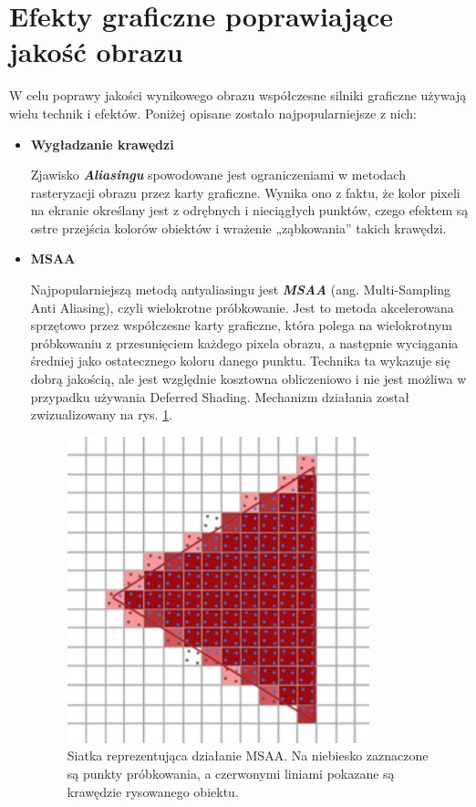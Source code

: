\section{Efekty graficzne poprawiające jakość obrazu}

W celu poprawy jakości wynikowego obrazu współczesne silniki graficzne używają wielu technik i efektów. Poniżej opisane zostało najpopularniejsze z nich:

\begin{itemize}
	\item \textbf{Wygładzanie krawędzi}

	Zjawisko \emph{\textbf{Aliasingu}} spowodowane jest ograniczeniami w metodach rasteryzacji obrazu przez karty graficzne. Wynika ono z faktu, że kolor pixeli na ekranie określany jest z odrębnych i nieciągłych punktów, czego efektem są ostre przejścia kolorów obiektów i wrażenie „ząbkowania'' takich krawędzi.
	
	\item \textbf{MSAA}
	
	Najpopularniejszą metodą antyaliasingu jest \emph{\textbf{MSAA}} (ang. Multi-Sampling Anti Aliasing), czyli wielokrotne próbkowanie. Jest to metoda akcelerowana sprzętowo przez współczesne karty graficzne, która polega na wielokrotnym próbkowaniu z przesunięciem każdego pixela obrazu, a następnie wyciągania średniej jako ostatecznego koloru danego punktu. Technika ta wykazuje się dobrą jakością, ale jest względnie kosztowna obliczeniowo i nie jest możliwa w przypadku używania Deferred Shading. Mechanizm działania został zwizualizowany na rys. \ref{intro-msaa}.
	
	\begin{figure}[htbp]
		\centering
		\includegraphics[width=3.4483in,height=3.5in]{images/9_MSAA_grid.png}
		\caption{Siatka reprezentująca działanie MSAA. Na niebiesko zaznaczone są punkty próbkowania, a czerwonymi liniami pokazane są krawędzie rysowanego obiektu. \cite{learnopengl:antialiasing:2024}}
		\label{intro-msaa}
	\end{figure}



\end{itemize}
